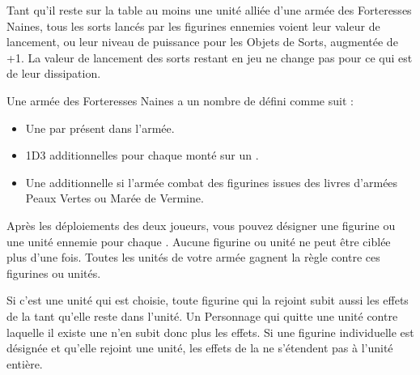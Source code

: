 \newcommand{\flameculverinrule}{%
\textbf{\artilleryweapon} de type \textbf{\flamethrower}.\newline
\range{3}, Force 3, \flamingattacks{}. Ne peut pas tirer si la figurine a effectué une Marche Forcée à ce Tour de Joueur. Ignorez le malus de -1 sur la table d'Incident de Tir.
}

\newcommand{\whirlingchainsofdoomrule}{%
Arme de Corps à Corps. Le porteur gagne +1 en Force, la règle \randomattacks{3D3} et attaque à Initiative 10. Il ne peut pas être rejoint par un Personnage.
}

\newcommand{\swiwelgunrule}{%
Arme de Tir. \range{24}, Force 4, \armourpiercing{1}, \multipleshots{4}, \quicktofire{}.
}











\startarmywiderules

\armywideruleentry{\hewnoutofmountains}

Tant qu'il reste sur la table au moins une unité alliée d'une armée des Forteresses Naines, tous les sorts lancés par les figurines ennemies voient leur valeur de lancement, ou leur niveau de puissance pour les Objets de Sorts, augmentée de +1. La valeur de lancement des sorts restant en jeu ne change pas pour ce qui est de leur dissipation.

\armywideruleentry{\ancientgrudge}

Une armée des Forteresses Naines a un nombre de \ancientgrudges{} défini comme suit :
\begin{itemize}[label={-}]
\item Une \ancientgrudge{} par \king{} présent dans l'armée.
\item 1D3 \ancientgrudges{} additionnelles pour chaque \king{} monté sur un \warthrone{}.
\item Une \ancientgrudge{} additionnelle si l'armée combat des figurines issues des livres d'armées Peaux Vertes ou Marée de Vermine.
\end{itemize}

Après les déploiements des deux joueurs, vous pouvez désigner une figurine ou une unité ennemie pour chaque \ancientgrudge{}. Aucune figurine ou unité ne peut être ciblée plus d'une fois. Toutes les unités de votre armée gagnent la règle \hatred{} contre ces figurines ou unités.

Si c'est une unité qui est choisie, toute figurine qui la rejoint subit aussi les effets de la \ancientgrudge{} tant qu'elle reste dans l'unité. Un Personnage qui quitte une unité contre laquelle il existe une \ancientgrudge{} n'en subit donc plus les effets. Si une figurine individuelle est désignée et qu'elle rejoint une unité, les effets de la \ancientgrudge{} ne s'étendent pas à l'unité entière. 

